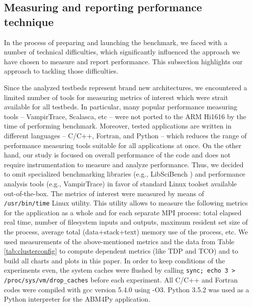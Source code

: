 \subsection{Measuring and reporting performance technique}
\label{sec:measuring}

In the process of preparing and launching the benchmark,
we faced with a number of technical difficulties,
which significantly influenced the approach
we have chosen to measure and report performance.
This subsection highlights our approach to tackling those difficulties.

Since the analyzed testbeds represent brand new architectures,
we encountered a limited number of tools for measuring metrics of interest
which were strait available for all testbeds.
In particular,
many popular performance measuring tools -- VampirTrace, Scalasca, etc --
were not ported to the ARM Hi1616 by the time of performing benchmark.
Moreover, tested applications are written in different languages -- C/C++, Fortran, and Python --
which reduces the range of performance measuring tools suitable for all applications at once.
On the other hand, our study is focused on overall performance of the code
and does not require instrumentation to measure and analyze performance.
Thus, we decided to omit specialized benchmarking libraries (e.g., \textsf{LibSciBench} \cite{2015:Hoefler})
and performance analysis tools (e.g., VampirTrace)
in favor of standard Linux toolset available out-of-the-box.
The metrics of interest were measured by means of \texttt{/usr/bin/time} Linux utility.
This utility allows to measure the following metrics for the application as a whole and for each separate MPI process:
total elapsed real time, number of filesystem inputs and outputs,
maximum resident set size of the process,
average total (data+stack+text) memory use of the process,
etc.
We used measurements of the above-mentioned metrics and the data from Table\,\ref{tab:clusterconfig}
to compute dependent metrics (like TDP and TCO) and to build all charts and plots in this paper.
In order to keep conditions of the experiments even, %
the system caches were flushed by calling
\texttt{sync; echo 3 > /proc/sys/vm/drop\_caches} before each experiment.
All C/C++ and Fortran codes were compiled with gcc version 5.4.0 using -O3.
Python 3.5.2 was used as a Python interpreter for the ABM4Py application.


